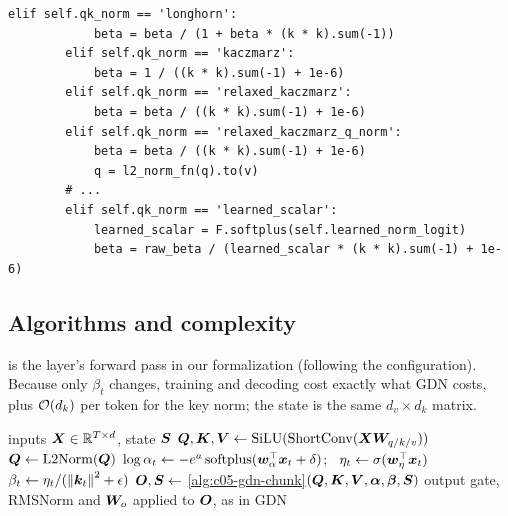 \begin{lstlisting}[caption={Excerpt from \texttt{repos/\allowbreak{}JiaxuanZou0714\_\_KaczmarzLinearAttention/\allowbreak{}lit\_gpt/\allowbreak{}gated\_delta\_net.py} (step-size modes; repository unconfirmed)},label={lst:c05-kla-modes}]
        elif self.qk_norm == 'longhorn':
            beta = beta / (1 + beta * (k * k).sum(-1))
        elif self.qk_norm == 'kaczmarz':
            beta = 1 / ((k * k).sum(-1) + 1e-6)
        elif self.qk_norm == 'relaxed_kaczmarz':
            beta = beta / ((k * k).sum(-1) + 1e-6)
        elif self.qk_norm == 'relaxed_kaczmarz_q_norm':
            beta = beta / ((k * k).sum(-1) + 1e-6)
            q = l2_norm_fn(q).to(v)
        # ...
        elif self.qk_norm == 'learned_scalar':
            learned_scalar = F.softplus(self.learned_norm_logit)
            beta = raw_beta / (learned_scalar * (k * k).sum(-1) + 1e-6)
\end{lstlisting}

\subsection{Algorithms and complexity}

 is the layer's forward pass in our formalization (following the
 configuration). Because only $\beta_t$ changes, training and decoding
cost exactly what GDN costs, plus $\mathcal{O}(d_k)$ per token for the key norm; the state is the same
$d_v\times d_k$ matrix.

\begin{algorithm}[t]
\caption{Kaczmarz linear attention layer, one head (our formalization)}
\label{alg:c05-kla}
\begin{algorithmic}[1]
\Require inputs $\bm{X} \in \mathbb{R}^{T\times d}$, state $\bm{S}$
\State $\bm{Q}, \bm{K}, \bm{V} \gets \operatorname{SiLU}(\mathrm{ShortConv}(\bm{X}\bm{W}_{q/k/v}))$ 
\State $\bm{Q} \gets \mathrm{L2Norm}(\bm{Q})$ 
\State $\log\alpha_t \gets -e^{a}\,\mathrm{softplus}(\bm{w}_\alpha^{\top}\bm{x}_t + \delta)$; \
       $\eta_t \gets \sigma(\bm{w}_\eta^{\top}\bm{x}_t)$
\State $\beta_t \gets \eta_t/(\left\lVert \bm{k}_t\right\rVert^2 + \epsilon)$ 
\State $\bm{O}, \bm{S} \gets$ \cref{alg:c05-gdn-chunk}$(\bm{Q}, \bm{K}, \bm{V}, \bm{\alpha}, \bm{\beta}, \bm{S})$
       \Comment{unchanged GDN kernel}
\State \Return output gate, RMSNorm and $\bm{W}_o$ applied to $\bm{O}$, as in GDN
\end{algorithmic}
\end{algorithm}

